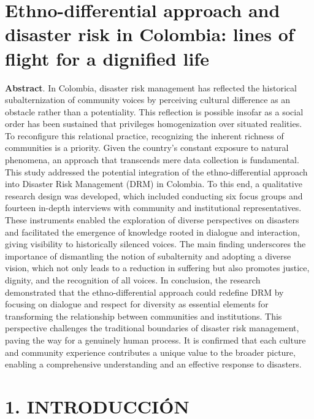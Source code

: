 \documentclass[
  spanish,
  letterpaper,
]{book}
\begin{document}
\label{abstract}

\chapter{Ethno-differential approach and disaster risk in Colombia:
lines of flight for a dignified
life}\label{ethno-differential-approach-and-disaster-risk-in-colombia-lines-of-flight-for-a-dignified-life}

\textbf{Abstract}. In Colombia, disaster risk management has reflected
the historical subalternization of community voices by perceiving
cultural difference as an obstacle rather than a potentiality. This
reflection is possible insofar as a social order has been sustained that
privileges homogenization over situated realities. To reconfigure this
relational practice, recognizing the inherent richness of communities is
a priority. Given the country's constant exposure to natural phenomena,
an approach that transcends mere data collection is fundamental. This
study addressed the potential integration of the ethno-differential
approach into Disaster Risk Management (DRM) in Colombia. To this end, a
qualitative research design was developed, which included conducting six
focus groups and fourteen in-depth interviews with community and
institutional representatives. These instruments enabled the exploration
of diverse perspectives on disasters and facilitated the emergence of
knowledge rooted in dialogue and interaction, giving visibility to
historically silenced voices. The main finding underscores the
importance of dismantling the notion of subalternity and adopting a
diverse vision, which not only leads to a reduction in suffering but
also promotes justice, dignity, and the recognition of all voices. In
conclusion, the research demonstrated that the ethno-differential
approach could redefine DRM by focusing on dialogue and respect for
diversity as essential elements for transforming the relationship
between communities and institutions. This perspective challenges the
traditional boundaries of disaster risk management, paving the way for a
genuinely human process. It is confirmed that each culture and community
experience contributes a unique value to the broader picture, enabling a
comprehensive understanding and an effective response to disasters.


\chapter{1. INTRODUCCIÓN}\label{introducciuxf3n-1}
\end{document}

